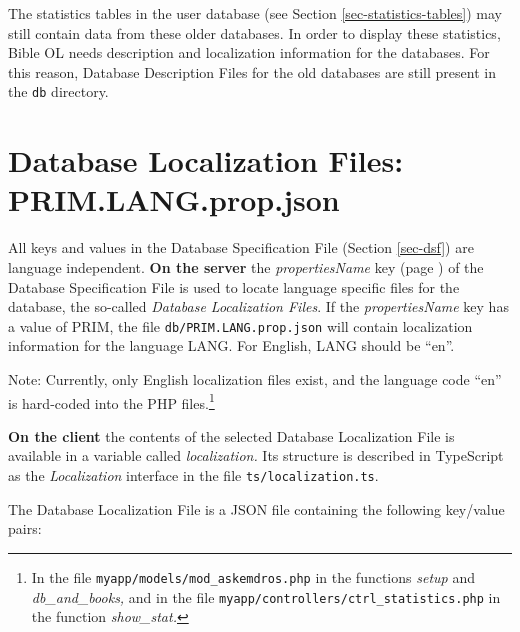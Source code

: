 \documentclass[11pt,oneside,a4paper]{memoir}
\begin{document}
The statistics tables in the user database (see Section \ref{sec-statistics-tables}) may
still contain data from these older databases. In order to display these statistics, Bible OL needs
description and localization information for the databases. For this reason, Database Description
Files for the old databases are still present in the \texttt{db} directory.



\section{Database Localization Files: PRIM.LANG.prop.json}\label{sec-db-local}

All keys and values in the Database Specification File (Section \ref{sec-dsf}) are language
independent. \textbf{On the server} the \emph{propertiesName} key (page \pageref{propname}) of the
Database Specification File is used to locate language specific files for the database, the
so-called \emph{Database Localization Files}. If the \emph{propertiesName} key has a value of PRIM,
the file \texttt{db/PRIM.LANG.prop.json} will contain localization information for the language LANG.
For English, LANG should be ``en''.

Note: Currently, only English localization files exist, and the language code ``en'' is hard-coded
into the PHP files.\footnote{In the file \texttt{myapp/models/mod\_askemdros.php} in the functions
  \emph{setup} and \emph{db\_and\_books,} and in the file
  \texttt{myapp/controllers/ctrl\_statistics.php} in the function \emph{show\_stat.}}

\textbf{On the client} the contents of the selected Database Localization File is available in a
variable called \emph{localization.} Its structure is described in TypeScript as the
\emph{Localization} interface in the file \texttt{ts/localization.ts}.

The Database Localization File is a JSON file containing the following key/value pairs:
\end{document}

